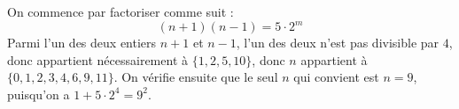 On commence par factoriser comme suit :
$$(n + 1)(n - 1) = 5\cdot 2^m$$
Parmi l'un des deux entiers $n + 1$ et $n - 1$, l'un des deux n'est pas divisible par $4$, donc appartient nécessairement à $\{1,2,5,10\}$, donc $n$ appartient à $\{0,1,2,3,4,6,9,11\}$. 
On vérifie ensuite que le seul $n$ qui convient est $n=9$, puisqu'on a $1+5\cdot 2^4=9^2$.